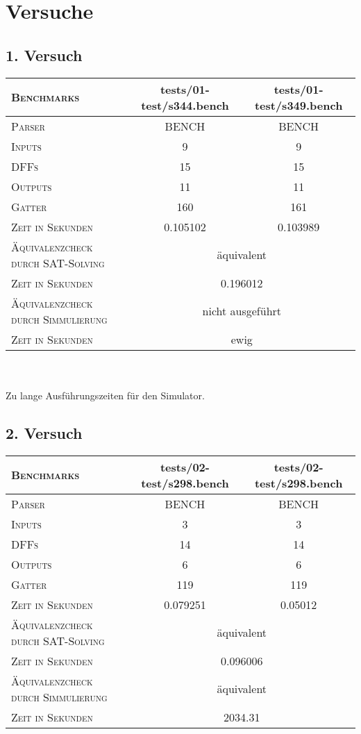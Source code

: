 \section{Versuche}

\subsection{1. Versuch}

\begin{tabular}{|l|c|c|}
	\hline
	\textsc{Benchmarks} & tests/01-test/s344.bench & tests/01-test/s349.bench \\
	\hline
	\hline
	\textsc{Parser} & BENCH & BENCH \\
	\hline
	\textsc{Inputs} & 9 & 9 \\
	\hline
	\textsc{DFFs} & 15 & 15 \\
	\hline
	\textsc{Outputs} & 11 & 11 \\
	\hline
	\textsc{Gatter} & 160 & 161 \\		
	\hline
	\textsc{Zeit in Sekunden} & 0.105102 &  0.103989 \\ 
	\hline
	\hline
	\textsc{Äquivalenzcheck durch SAT-Solving} & \multicolumn{2}{|c|}{äquivalent} \\
	\hline
	\textsc{Zeit in Sekunden} & \multicolumn{2}{|c|}{0.196012} \\
	\hline
	\hline
	\textsc{Äquivalenzcheck durch Simmulierung} & \multicolumn{2}{|c|}{nicht ausgeführt} \\
	\hline
	\textsc{Zeit in Sekunden} & \multicolumn{2}{|c|}{ewig} \\
	\hline
\end{tabular}
\\\\ 
Zu lange Ausführungszeiten für den Simulator.

\subsection{2. Versuch}

\begin{tabular}{|l|c|c|}
	\hline
	\textsc{Benchmarks} & tests/02-test/s298.bench & tests/02-test/s298.bench \\
	\hline
	\hline
	\textsc{Parser} & BENCH & BENCH \\
	\hline
	\textsc{Inputs} & 3 & 3 \\
	\hline
	\textsc{DFFs} & 14 & 14 \\
	\hline
	\textsc{Outputs} & 6 & 6 \\
	\hline
	\textsc{Gatter} & 119 & 119 \\		
	\hline
	\textsc{Zeit in Sekunden} & 0.079251 &  0.05012 \\ 
	\hline
	\hline
	\textsc{Äquivalenzcheck durch SAT-Solving} & \multicolumn{2}{|c|}{äquivalent} \\
	\hline
	\textsc{Zeit in Sekunden} & \multicolumn{2}{|c|}{0.096006} \\
	\hline
	\hline
	\textsc{Äquivalenzcheck durch Simmulierung} & \multicolumn{2}{|c|}{äquivalent} \\
	\hline
	\textsc{Zeit in Sekunden} & \multicolumn{2}{|c|}{2034.31} \\
	\hline
\end{tabular}

